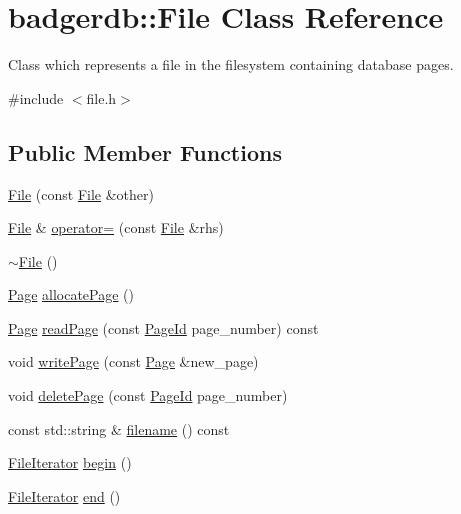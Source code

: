 \hypertarget{classbadgerdb_1_1File}{\section{badgerdb\-:\-:File Class Reference}
\label{classbadgerdb_1_1File}
}


Class which represents a file in the filesystem containing database pages.  




{\ttfamily \#include $<$file.\-h$>$}

\subsection*{Public Member Functions}
\begin{DoxyCompactItemize}
\item 
\hyperlink{classbadgerdb_1_1File_a600baaf77d18f39e51ae7473eca633c4}{File} (const \hyperlink{classbadgerdb_1_1File}{File} \&other)
\item 
\hyperlink{classbadgerdb_1_1File}{File} \& \hyperlink{classbadgerdb_1_1File_ac403c631aec085e9f12992f260a57155}{operator=} (const \hyperlink{classbadgerdb_1_1File}{File} \&rhs)
\item 
\hyperlink{classbadgerdb_1_1File_a97fd6e3ae8dd11be883289b69d560287}{$\sim$\-File} ()
\item 
\hyperlink{classbadgerdb_1_1Page}{Page} \hyperlink{classbadgerdb_1_1File_a7d0e047bcc8dc4cee36aac5b2060bbe3}{allocate\-Page} ()
\item 
\hyperlink{classbadgerdb_1_1Page}{Page} \hyperlink{classbadgerdb_1_1File_aba4762b533499b7b7cc0774192ead27c}{read\-Page} (const \hyperlink{namespacebadgerdb_a1f49e404293bf4240756b89b53b1587a}{Page\-Id} page\-\_\-number) const 
\item 
void \hyperlink{classbadgerdb_1_1File_a9a1b3cc43c4631bde58c1c4f670e1036}{write\-Page} (const \hyperlink{classbadgerdb_1_1Page}{Page} \&new\-\_\-page)
\item 
void \hyperlink{classbadgerdb_1_1File_a829a68ccfbeb0c9f66f3a2db7e0b99fe}{delete\-Page} (const \hyperlink{namespacebadgerdb_a1f49e404293bf4240756b89b53b1587a}{Page\-Id} page\-\_\-number)
\item 
const std\-::string \& \hyperlink{classbadgerdb_1_1File_ac61ce3c2233fd1f7e2e2a8a5a7640936}{filename} () const 
\item 
\hyperlink{classbadgerdb_1_1FileIterator}{File\-Iterator} \hyperlink{classbadgerdb_1_1File_a32e94f392eb3740dd9eb9101b9e09d47}{begin} ()
\item 
\hyperlink{classbadgerdb_1_1FileIterator}{File\-Iterator} \hyperlink{classbadgerdb_1_1File_a01e224676a67634f21d53fc4189b8f11}{end} ()
\end{DoxyCompactItemize}
